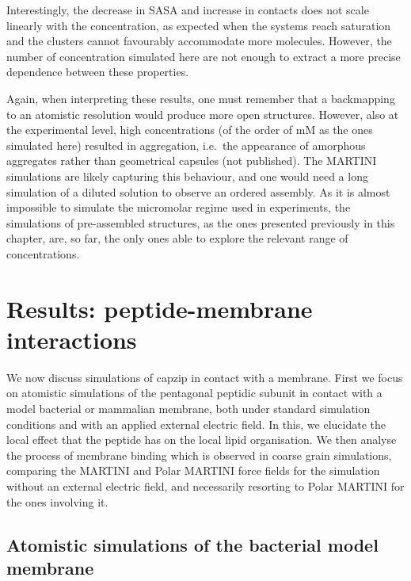 Interestingly, the decrease in SASA and increase in contacts does not scale linearly with the concentration, as expected when the systems reach saturation and the clusters cannot favourably accommodate more molecules. However, the number of concentration simulated here are not enough to extract a more precise dependence between these properties.

Again, when interpreting these results, one must remember that a backmapping to an atomistic resolution would produce more open structures. However, also at the experimental level, high concentrations (of the order of mM as the ones simulated here) resulted in aggregation, i.e.\ the appearance of amorphous aggregates rather than geometrical capsules (not published). The MARTINI simulations are likely capturing this behaviour, and one would need a long simulation of a diluted solution to observe an ordered assembly. As it is almost impossible to simulate the micromolar regime used in experiments, the simulations of pre-assembled structures, as the ones presented previously in this chapter, are, so far, the only ones able to explore the relevant range of concentrations.













\section{Results: peptide-membrane interactions}

We now discuss simulations of capzip in contact with a membrane. First we focus on atomistic simulations of the pentagonal peptidic subunit in contact with a model bacterial or mammalian membrane, both under standard simulation conditions and with an applied external electric field. In this, we elucidate the local effect that the peptide has on the local lipid organisation.
%
We then analyse the process of membrane binding which is observed in coarse grain simulations, comparing the MARTINI and Polar MARTINI force fields for the simulation without an external electric field, and necessarily resorting to Polar MARTINI for the ones involving it. 


\subsection{Atomistic simulations of the bacterial model membrane} \label{sec:lip_atom_bact}

